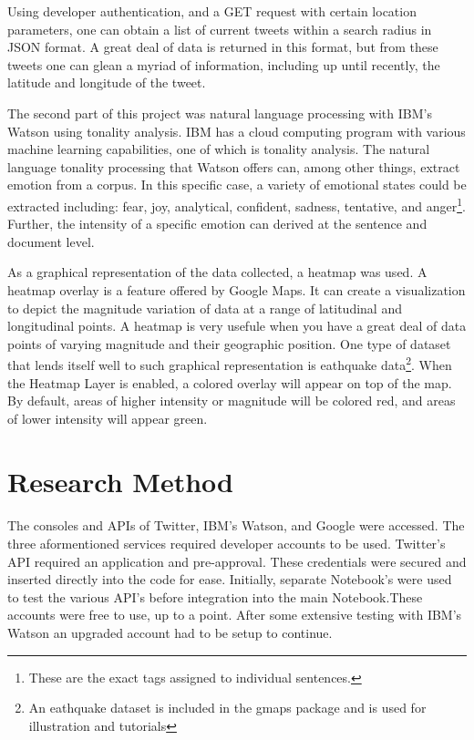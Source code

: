 \documentclass[12pt, oneside]{article}
\begin{document}
Using developer authentication, and a GET request with certain location
parameters, one can obtain a list of current tweets within a search radius in
JSON format. A great deal of data is returned in this format, but from
these tweets one can glean a myriad of information, including up until
recently, the latitude and longitude of the tweet.

The second part of this project was natural language processing with IBM's
Watson using tonality analysis. IBM has a cloud computing program with various
machine learning capabilities\cite{IBM}, one of which is tonality analysis. The
natural language tonality processing that Watson offers can, among other
things, extract emotion from a corpus. In this specific case, a variety of
emotional states could be extracted including: fear, joy, analytical,
confident, sadness, tentative, and anger\footnote{These are the exact tags
assigned to individual sentences.}. Further, the intensity of a specific
emotion can derived at the sentence and document level.

As a graphical representation of the data collected, a heatmap was used. A
heatmap overlay is a feature offered by Google Maps. It can create a
visualization to depict the magnitude variation of data at a range of
latitudinal and longitudinal points. A heatmap is very usefule when you have a
great deal of data points of varying magnitude and their geographic position.
One type of dataset that lends itself well to such graphical representation is
eathquake data\footnote{An eathquake
dataset is included in the gmaps package and is used for illustration and
tutorials}. When the Heatmap Layer is enabled, a colored overlay will appear on
top of the map. By default, areas of higher intensity or magnitude will be
colored red, and areas of lower intensity will appear green\cite{Google}.

\section{Research Method}
\paragraph{}
The consoles and APIs of Twitter, IBM's Watson, and Google were
accessed. The three aformentioned services required developer accounts to be
used. Twitter's API required an application and pre-approval. These
credentials were secured and inserted directly into the code for ease.
Initially, separate Notebook's were used to test the various API's before
integration into the main Notebook.These accounts were free to use, up to a
point. After some extensive testing with IBM's Watson an
upgraded account had to be setup to continue.
\end{document}
